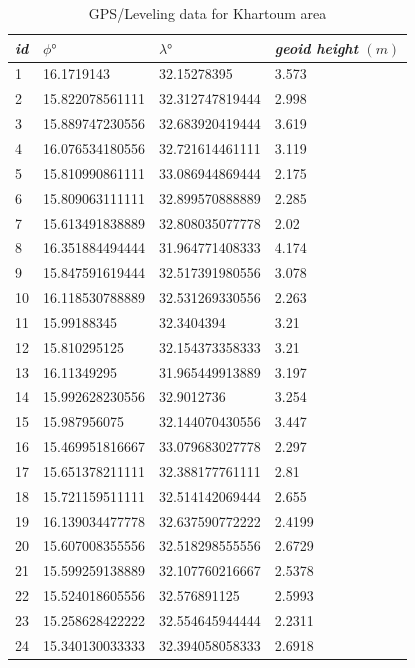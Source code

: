 \begin{table}[]
	\centering
	\caption{GPS/Leveling data for Khartoum area}
	\label{gps_leveling}
		\begin{tabular}{@{}llll@{}}
			\toprule
			\emph{id} & $\phi \si{\degree}$  & $\lambda \si{\degree}$ & \emph{geoid height} $(m)$ \\ \midrule
			1 & 16.1719143 & 32.15278395 & 3.573 \\
			2 & 15.822078561111 & 32.312747819444 & 2.998\\
			3 & 15.889747230556 & 32.683920419444 & 3.619\\
			4 & 16.076534180556 & 32.721614461111 & 3.119\\
			5 & 15.810990861111 & 33.086944869444 & 2.175\\
			6 & 15.809063111111 & 32.899570888889 & 2.285\\
			7 & 15.613491838889 & 32.808035077778 & 2.02\\
			8 & 16.351884494444 & 31.964771408333 & 4.174\\
			9 & 15.847591619444 & 32.517391980556 & 3.078\\
			10 &16.118530788889 & 32.531269330556 & 2.263\\
			11 &15.99188345 & 32.3404394 & 3.21\\
			12 &15.810295125 & 32.154373358333 & 3.21\\
			13 &16.11349295 & 31.965449913889 & 3.197\\
			14 & 15.992628230556 & 32.9012736 & 3.254\\
			15 & 15.987956075 & 32.144070430556 & 3.447\\
			16 & 15.469951816667 & 33.079683027778 & 2.297\\
			17 & 15.651378211111 & 32.388177761111 & 2.81\\
			18 & 15.721159511111 & 32.514142069444 & 2.655\\
			19 & 16.139034477778 & 32.637590772222 & 2.4199\\
			20 & 15.607008355556 & 32.518298555556 & 2.6729\\
			21 & 15.599259138889 & 32.107760216667 & 2.5378\\
			22 & 15.524018605556 & 32.576891125 & 2.5993\\
			23 & 15.258628422222 & 32.554645944444 & 2.2311\\
			24 & 15.340130033333 & 32.394058058333 & 2.6918\\ \bottomrule
			

		\end{tabular}
\end{table}


